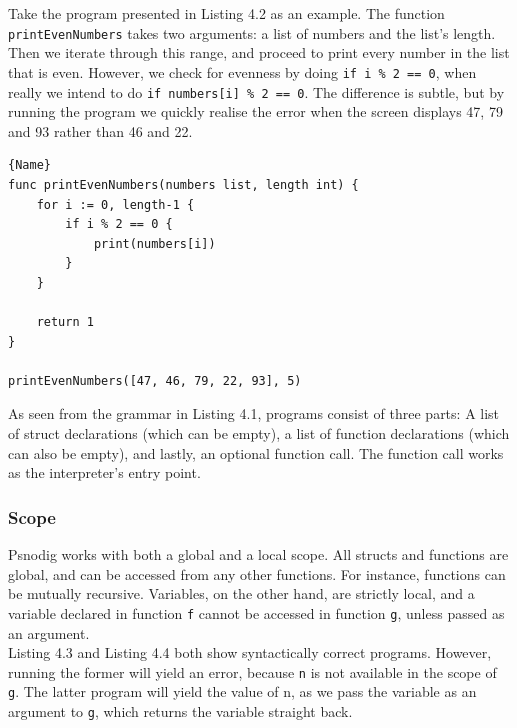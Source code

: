 Take the program presented in Listing 4.2 as an example. The function \\ \texttt{printEvenNumbers} takes two arguments: a list of numbers and the list's length. Then we iterate through this range, and proceed to print every number in the list that is even. However, we check for evenness by doing \texttt{if i \% 2 == 0}, when really we intend to do \texttt{if numbers[i] \% 2 == 0}. The difference is subtle, but by running the program we quickly realise the error when the screen displays 47, 79 and 93 rather than 46 and 22. \hfill \\

\begin{lstlisting}[caption={A syntactically correct program with a subtle logical error}, captionpos=b, frame=tlrb]{Name}
func printEvenNumbers(numbers list, length int) {
    for i := 0, length-1 {
        if i % 2 == 0 {
            print(numbers[i])
        }
    }

    return 1
}

printEvenNumbers([47, 46, 79, 22, 93], 5)
\end{lstlisting}


As seen from the grammar in Listing 4.1, programs consist of three parts: A list of struct declarations (which can be empty), a list of function declarations (which can also be empty), and lastly, an optional function call. The function call works as the interpreter's entry point.

\subsubsection{Scope}

Psnodig works with both a global and a local scope. All structs and functions are global, and can be accessed from any other functions. For instance, functions can be mutually recursive. Variables, on the other hand, are strictly local, and a variable declared in function \texttt{f} cannot be accessed in function \texttt{g}, unless passed as an argument. \hfill \\

Listing 4.3 and Listing 4.4 both show syntactically correct programs. However, running the former will yield an error, because \texttt{n} is not available in the scope of \texttt{g}. The latter program will yield the value of {n}, as we pass the variable as an argument to \texttt{g}, which returns the variable straight back. \hfill \\

